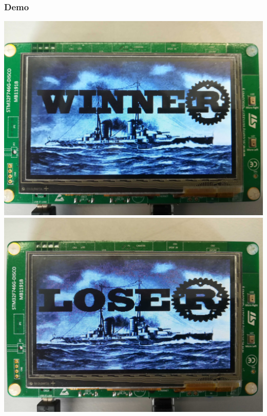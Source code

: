 \documentclass[handout]{beamer}
\begin{document}
\begin{frame}
	\frametitle{Demo}
	\includegraphics[scale=0.035]{Bilder/win.jpg}
	\includegraphics[scale=0.035]{Bilder/lose.jpg}
\end{frame}
\end{document}
